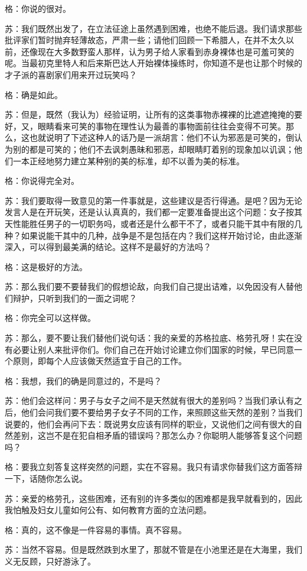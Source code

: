 \documentclass[12pt,oneside]{book}
\begin{document}
格：你说的很对。

苏：我们既然出发了，在立法征途上虽然遇到困难，也绝不能后退。我们请求那些批评家们暂时抛弃轻薄故态，严肃一些；请他们回顾一下希腊人，在并不太久以前，还像现在大多数野蛮人那样，认为男子给人家看到赤身裸体也是可羞可笑的呢。当最初克里特人和后来斯巴达人开始裸体操练时，你知道不是也让那个时候的才子派的喜剧家们用来开过玩笑吗？

格：确是如此。

苏：但是，既然（我认为）经验证明，让所有的这类事物赤裸裸的比遮遮掩掩的要好，又，眼睛看来可笑的事物在理性认为最善的事物面前往往会变得不可笑。那么，这也就说明了下述这种人的话乃是一派胡言：他们不认为邪恶是可笑的，倒认为别的都是可笑的；他们不去讽刺愚昧和邪恶，却眼睛盯着别的现象加以讥讽；他们一本正经地努力建立某种别的美的标准，却不以善为美的标准。

格：你说得完全对。

苏：我们要取得一致意见的第一件事就是，这些建议是否行得通。是吧？因为无论发言人是在开玩笑，还是认认真真的，我们都一定要准备提出这个问题：女子按其天性能胜任男子的一切职务吗，或者还是什么都干不了，或者只能干其中有限的几种？如果说能干其中的几种，战争是不是包括在内？我们这样开始讨论，由此逐渐深入，可以得到最美满的结论。这样不是最好的方法吗？

格：这是极好的方法。

苏：那么我们要不要替我们的假想论敌，向我们自己提出诘难，以免因没有人替他们辩护，只听到我们的一面之词呢？

格：你完全可以这样做。

苏：那么，要不要让我们替他们说句话：我的亲爱的苏格拉底、格劳孔呀！实在没有必要让别人来批评你们。你们自己在开始讨论建立你们国家的时候，早已同意一个原则，即每个人应该做天然适宜于自己的工作。

格：我想，我们的确是同意过的，不是吗？

苏：他们会这样问：男子与女子之间不是天然就有很大的差别吗？当我们承认有之后，他们会问我们要不要给男子女子不同的工作，来照顾这些天然的差别？当我们说要的，他们会再问下去：既说男女应该有同样的职业，又说他们之间有很大的自然差别，这岂不是在犯自相矛盾的错误吗？那怎么办？你聪明人能够答复这个问题吗？

格：要我立刻答复这样突然的问题，实在不容易。我只有请求你替我们这方面答辩一下，话随你怎么说。

苏：亲爱的格劳孔，这些困难，还有别的许多类似的困难都是我早就看到的，因此我怕触及妇女儿童如何公有、如何教育方面的立法问题。

格：真的，这不像是一件容易的事情。真不容易。

苏：当然不容易。但是既然跌到水里了，那就不管是在小池里还是在大海里，我们义无反顾，只好游泳了。
\end{document}
